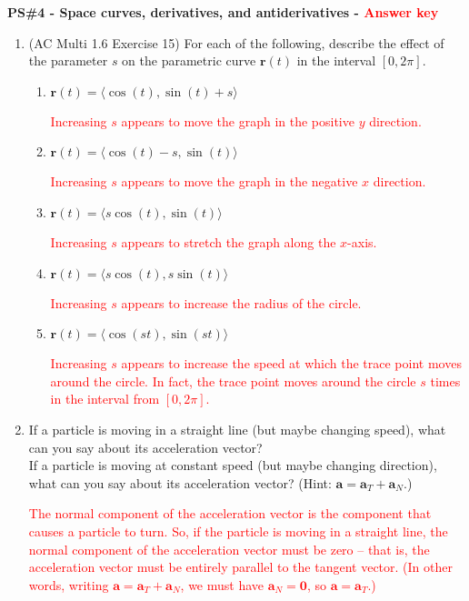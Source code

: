 \documentclass[10pt]{article}
\newcommand{\vr}{\mathbf{r}}
\newcommand{\red}[1]{ %
	\textcolor{red}{#1} }%
\renewcommand{\section}[1]{\begin{center} \textbf{#1} \\\end{center}}
\begin{document}
	
	
	\allowdisplaybreaks
	\section{PS\#4 - Space curves, derivatives, and antiderivatives - \red{Answer key} }
	
	\begin{enumerate}[leftmargin=0pt]
		\item (AC Multi 1.6 Exercise 15) For each of the following, describe the effect of the parameter $s$ on the parametric curve $\vr(t)$ in the interval $[0, 2\pi]$.
		\begin{enumerate}
		    \item $\vr(t) = \langle \cos(t), \sin(t) +s \rangle$
		    
		    \red{Increasing $s$ appears to move the graph in the positive $y$ direction.}
		    \item $\vr(t) = \langle \cos(t) - s, \sin(t)\rangle$
		    
		    \red{Increasing $s$ appears to move the graph in the negative $x$ direction.}
		    \item $\vr(t) = \langle s \cos(t), \sin(t)\rangle$
		    
		    \red{Increasing $s$ appears to stretch the graph along the $x$-axis.}
		    \item $\vr(t) = \langle s \cos(t), s \sin(t)\rangle$
		    
		    \red{Increasing $s$ appears to increase the radius of the circle.}
		    \item $\vr(t) = \langle \cos(st), \sin(st)\rangle$
		    
		    \red{Increasing $s$ appears to increase the speed at which the trace point moves around the circle. In fact, the trace point moves around the circle $s$ times in the interval from $[0, 2\pi]$.}
		\end{enumerate}
		
		\item If a particle is moving in a straight line (but maybe changing speed), what can you say about its acceleration vector? \\
		If a particle is moving at constant speed (but maybe changing direction), what can you say about its acceleration vector? (Hint: $\mathbf{a} = \mathbf{a}_T + \mathbf{a}_N$.)
		
		\red{
			The normal component of the acceleration vector is the component that causes a particle to turn. So, if the particle is moving in a straight line, the normal component of the acceleration vector must be zero -- that is, the acceleration vector must be entirely parallel to the tangent vector. (In other words, writing 
			$\mathbf{a} = \mathbf{a}_T + \mathbf{a}_N$, we must have 
			$\mathbf{a}_N = \mathbf{0}$, so 
			$\mathbf{a} = \mathbf{a}_T$.)
		}
		

\end{enumerate}
\end{document}
